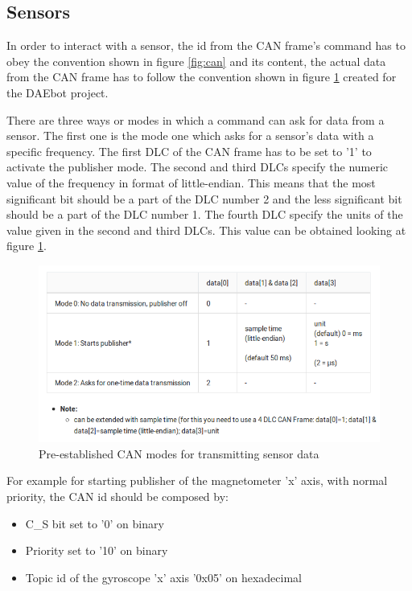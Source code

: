 \documentclass[12pt]{report}%
\begin{document}
\subsection{Sensors}
\label{sub:sensors}
In order to interact with a sensor, the id from the CAN frame's command has to obey the convention shown in figure \ref{fig:can} and its content, the actual data from the CAN frame has to follow the convention shown in figure  \ref{fig:sensormodes} created for the DAEbot project.

There are three ways or modes in which a command can ask for data from a sensor. The first one is the mode one which asks for a sensor's data with a specific frequency. The first DLC of the CAN frame has to be set to '1' to activate the publisher mode. The second and third DLCs specify the numeric value of the frequency in format of little-endian. This means that the most significant bit should be a part of the DLC number 2 and the less significant bit should be a part of the DLC number 1. The fourth DLC specify the units of the value given in the second and third DLCs. This value can be obtained looking at figure \ref{fig:sensormodes}.

\begin{figure}[ht]
	\centering
	\includegraphics[width=\textwidth]{modes}
    \caption{Pre-established CAN modes for transmitting sensor data \cite{DAEbot_Wiki}}
    \label{fig:sensormodes}
\end{figure}

For example for starting publisher of the magnetometer 'x' axis, with normal priority, the CAN id should be composed by:

\begin{itemize}
	\item C\_S bit set to '0' on binary
	\item Priority set to '10' on binary
	\item Topic id of the gyroscope 'x' axis '0x05' on hexadecimal
\end{itemize}
\end{document}
